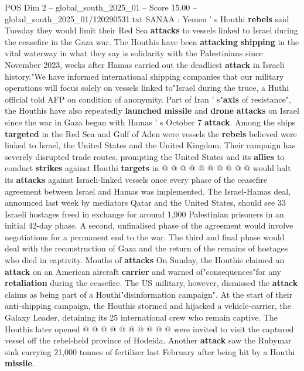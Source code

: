 \begin{textsample}{POS Dim 2 – global\_south\_2025\_01 – Score 15.00 – global\_south\_2025\_01/120290531.txt}  \label{ex:f2_pos_328}
SANAA : Yemen ' s Houthi \textbf{rebels} said Tuesday they would limit their Red Sea \textbf{attacks} to vessels linked to Israel during the ceasefire in the Gaza war.
The Houthis have been \textbf{attacking} \textbf{shipping} in the vital waterway in what they say is solidarity with the Palestinians since November 2023, weeks after Hamas carried out the deadliest \textbf{attack} in Israeli history."We have informed international shipping companies that our military operations will focus solely on vessels linked to"Israel during the truce, a Huthi official told AFP on condition of anonymity.
Part of Iran ' s"\textbf{axis} of resistance", the Houthis have also repeatedly \textbf{launched} \textbf{missile} and \textbf{drone} \textbf{attacks} on Israel since the war in Gaza began with Hamas ' s October 7 \textbf{attack}.
Among the ships \textbf{targeted} in the Red Sea and Gulf of Aden were vessels the \textbf{rebels} believed were linked to Israel, the United States and the United Kingdom.
Their campaign has severely disrupted trade routes, prompting the United States and its \textbf{allies} to conduct \textbf{strikes} against Houthi \textbf{targets} in @ @ @ @ @ @ @ @ @ @ would halt its \textbf{attacks} against Israeli-linked vessels once every phase of the ceasefire agreement between Israel and Hamas was implemented.
The Israel-Hamas deal, announced last week by mediators Qatar and the United States, should see 33 Israeli hostages freed in exchange for around 1,900 Palestinian prisoners in an initial 42-day phase.
A second, unfinalised phase of the agreement would involve negotiations for a permanent end to the war.
The third and final phase would deal with the reconstruction of Gaza and the return of the remains of hostages who died in captivity.
Months of \textbf{attacks} On Sunday, the Houthis claimed an \textbf{attack} on an American aircraft \textbf{carrier} and warned of"consequences"for any \textbf{retaliation} during the ceasefire.
The US military, however, dismissed the \textbf{attack} claims as being part of a Houthi"disinformation campaign".
At the start of their anti-shipping campaign, the Houthis stormed and hijacked a vehicle-carrier, the Galaxy Leader, detaining its 25 international crew who remain captive.
The Houthis later opened @ @ @ @ @ @ @ @ @ @ were invited to visit the captured vessel off the rebel-held province of Hodeida.
Another \textbf{attack} saw the Rubymar sink carrying 21,000 tonnes of fertiliser last February after being hit by a Houthi \textbf{missile}.

\end{textsample}
